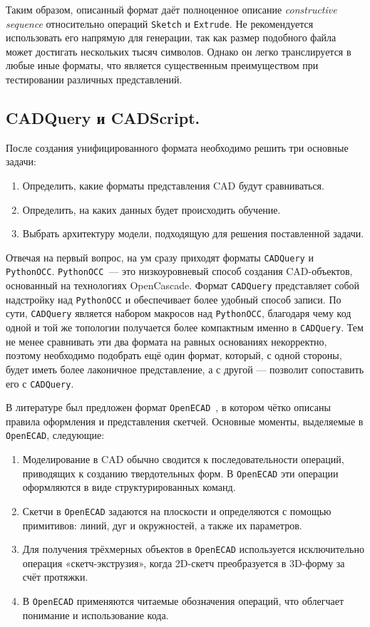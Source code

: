 Таким образом, описанный формат даёт полноценное описание \textit{constructive sequence}
относительно операций \texttt{Sketch} и \texttt{Extrude}. Не рекомендуется использовать его напрямую для генерации,
так как размер подобного файла может достигать нескольких тысяч символов.
Однако он легко транслируется в любые иные форматы, что является существенным преимуществом при тестировании различных представлений.

\subsection{CADQuery и CADScript.}

После создания унифицированного формата необходимо решить три основные задачи:
\begin{enumerate}
    \item Определить, какие форматы представления CAD будут сравниваться.
    \item Определить, на каких данных будет происходить обучение.
    \item Выбрать архитектуру модели, подходящую для решения поставленной задачи.
\end{enumerate}

Отвечая на первый вопрос, на ум сразу приходят форматы \texttt{CADQuery} и \texttt{PythonOCC}.
\texttt{PythonOCC}~--- это низкоуровневый способ создания CAD-объектов, основанный на технологиях OpenCascade.
Формат \texttt{CADQuery} представляет собой надстройку над \texttt{PythonOCC} и обеспечивает более удобный
способ записи. По сути, \texttt{CADQuery} является набором макросов над \texttt{PythonOCC}, благодаря чему
код одной и той же топологии получается более компактным именно в \texttt{CADQuery}. Тем не менее
сравнивать эти два формата на равных основаниях некорректно, поэтому необходимо подобрать ещё один формат,
который, с одной стороны, будет иметь более лаконичное представление, а с другой --- позволит сопоставить его
с \texttt{CADQuery}.

В литературе был предложен формат \texttt{OpenECAD}~\cite{yuan24_openecad}, в котором чётко описаны правила
оформления и представления скетчей. Основные моменты, выделяемые в \texttt{OpenECAD}, следующие:
\begin{enumerate}
    \item Моделирование в CAD обычно сводится к последовательности операций, приводящих к созданию твердотельных форм.
          В \texttt{OpenECAD} эти операции оформляются в виде структурированных команд.
    \item Скетчи в \texttt{OpenECAD} задаются на плоскости и определяются с помощью примитивов:
          линий, дуг и окружностей, а также их параметров.
    \item Для получения трёхмерных объектов в \texttt{OpenECAD} используется исключительно операция
          «скетч-экструзия», когда 2D-скетч преобразуется в 3D-форму за счёт протяжки.
    \item В \texttt{OpenECAD} применяются читаемые обозначения операций, что облегчает понимание
          и использование кода.
\end{enumerate}

